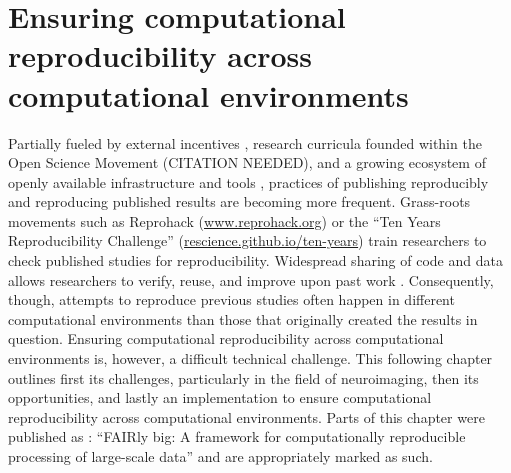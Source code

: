 


\chapter{Ensuring computational reproducibility across computational environments}
\label{chap:k3}

Partially fueled by external incentives \citep{mckiernan2016open}, research curricula founded within the Open Science Movement (CITATION NEEDED), and a growing ecosystem of openly available infrastructure and tools \citep{NISO2022119623}, practices of publishing reproducibly and reproducing published results are becoming more frequent.
Grass-roots movements such as Reprohack (\href{https://www.reprohack.org/}{www.reprohack.org}) or the ``Ten Years Reproducibility Challenge'' (\href{https://rescience.github.io/ten-years/}{rescience.github.io/ten-years}) train researchers to check published studies for reproducibility.
Widespread sharing of code and data allows researchers to verify, reuse, and improve upon past work \citep{borghi2018data}.
Consequently, though, attempts to reproduce previous studies often happen in different computational environments than those that originally created the results in question.
Ensuring computational reproducibility across computational environments is, however, a difficult technical challenge.
This following chapter outlines first its challenges, particularly in the field of neuroimaging, then its opportunities, and lastly an implementation to ensure computational reproducibility across computational environments.
Parts of this chapter were published as \citet{wagner2022fairly}: ``FAIRly big: A framework for computationally reproducible processing of large-scale data'' and are appropriately marked as such.


